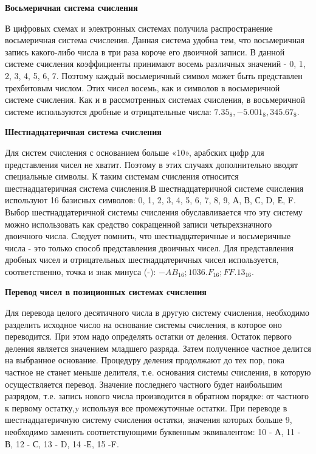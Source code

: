 \documentclass[a4paper]{article}
\begin{document}
\textbf{Восьмеричная система счисления}

В цифровых схемах и электронных системах получила распространение восьмеричная система счисления. Данная система удобна тем, что восьмеричная запись какого-либо числа в три раза короче его двоичной записи. В данной системе счисления коэффициенты принимают восемь различных значений - 0, 1, 2, 3, 4, 5, 6, 7.
Поэтому каждый восьмеричный символ может быть представлен трехбитовым числом. Этих чисел восемь, как и символов в восьмеричной системе счисления. Как и в рассмотренных системах счисления, в восьмеричной системе используются дробные и отрицательные числа: $7.35_{8},- 5.001_{8}, 345.67_{8}$.

\textbf{Шестнадцатеричная система счисления}

Для систем счисления с основанием больше «10», арабских цифр для представления чисел не хватит. Поэтому в этих случаях дополнительно вводят специальные символы. К таким системам счисления относится шестнадцатеричная система счисления.В шестнадцатеричной системе счисления используют 16 базисных символов: 0, 1, 2, 3, 4, 5, 6, 7, 8, 9, А, В, С, D, Е, F. Выбор шестнадцатеричной системы счисления обуславливается что эту систему можно использовать как средство сокращенной записи четырехзначного двоичного числа. Следует помнить, что шестнадцатеричные и восьмеричные числа - это только способ представления двоичных чисел. Для представления дробных чисел и отрицательных шестнадцатеричных чисел используется, соответственно, точка и знак минуса (-): $-AB_{16}; 1036.F_{16};FF.13_{16}$.

\textbf{Перевод чисел в позиционных системах счисления}

Для перевода целого десятичного числа в другую систему счисления, необходимо разделить исходное число на основание системы счисления, в которое оно переводится. При этом надо определять остатки от деления. Остаток первого деления является значением младшего разряда. Затем полученное частное делится на выбранное основание. Процедуру деления продолжают до тех пор, пока частное не станет меньше делителя, т.е. основания системы счисления, в которую осуществляется перевод. Значение последнего частного будет наибольшим разрядом, т.е. запись нового числа производится в обратном порядке: от частного к первому остатку,y используя все промежуточные остатки. При переводе в шестнадцатеричную систему счисления остатки, значения которых больше 9, необходимо заменить соответствующими буквенным эквивалентом: 10 - А, 11 - В, 12 - С, 13 - D, 14 -Е, 15 -F.
\end{document}
